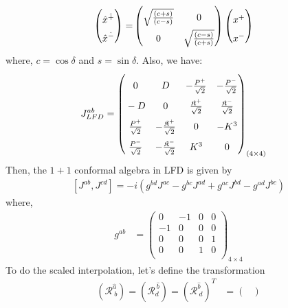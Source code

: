 \documentclass[]{article}
\numberwithin{equation}{section}
\begin{document}
{{\begin{align}
\begin{pmatrix}
   \rule{0pt}{16pt} \hat{x}^{\hat{+}}\\
    \rule{0pt}{16pt} \hat{x}^{\hat{-}}
  \end{pmatrix}=&
  \begin{pmatrix}
    \rule{0pt}{16pt} \sqrt{\frac{(c+s)}{(c-s)}}  & 0 \\
    \rule{0pt}{16pt} 0  & \sqrt{\frac{(c-s)}{(c+s)}} 
  \end{pmatrix}
  \begin{pmatrix}
    \rule{0pt}{16pt} x^{+}\\
   \rule{0pt}{16pt} x^{-}
  \end{pmatrix}
\end{align}
where, $c=\cos{\delta}$ and $s=\sin{\delta}$. Also, we have:
\begin{align}
    J^{{a}{b}}_{LFD}&=\begin{pmatrix}
    \rule{0pt}{16pt} 0&D&-\frac{P^{{+}}}{\sqrt{2}}&-\frac{P^{{-}}}{\sqrt{2}}\\
    \rule{0pt}{16pt} -D&0&\frac{\mathfrak{K}^{{+}}}{\sqrt{2}}&\frac{\mathfrak{K}^{{-}}}{\sqrt{2}}\\
    \rule{0pt}{16pt} \frac{P^{{+}}}{\sqrt{2}}&-\frac{\mathfrak{K}^{{+}}}{\sqrt{2}}&0  & -K^3\\
    \rule{0pt}{16pt} \frac{P^{{-}}}{\sqrt{2}}&-\frac{\mathfrak{K}^{{-}}}{\sqrt{2}}&K^3  & 0
  \end{pmatrix}_{(4\times4)}
\end{align}
Then, the $1+1$ conformal algebra in LFD is given by
  \begin{align}
      \left[J^{{{a}}{{b}}},J^{{{c}}{{d}}}\right]=-i\left(g^{{{b}}{{d}}}J^{{{a}}{{c}}}-g^{{{b}}{{c}}}J^{{{a}}{{d}}}+g^{{{a}}{{c}}}J^{{{b}}{{d}}}-g^{{{a}}{{d}}}J^{{{b}}{{c}}}\right)\label{AM_algebra}
  \end{align}
where, 
\begin{align}
    g^{{a}{b}}&=\begin{pmatrix}
  0&-1&0&0\\
  -1&0&0&0\\
  0&0&0&1\\
  0&0&1&0\\
  \end{pmatrix}_{4\times4}
\end{align}
To do the scaled interpolation, let's define the transformation 
\begin{align}
    (\mathcal{R}^{\hat{a}}_{~b})=(\mathcal{R}^{~\hat{b}}_{{d}})=(\mathcal{R}^{\hat{b}}_{{~d}})^{T}&=\begin{pmatrix}

\end{pmatrix}
\end{align}}}
\end{document}
